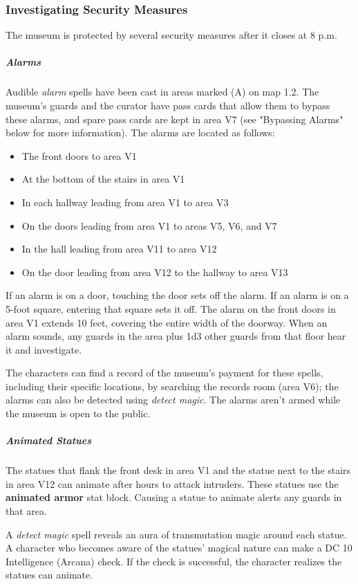 \documentclass[10pt,a4paper,twoside,bg=print,twocolumn,openany,nodeprecatedcode]{dndbook}
\begin{document}
\subsubsection{Investigating Security Measures}
The museum is protected by several security measures after it closes at 8 p.m.

\subparagraph{Alarms}
Audible \textit{alarm} spells have been cast in areas marked (A) on map 1.2. The museum's guards and the curator have pass cards that allow them to bypass these alarms, and spare pass cards are kept in area V7 (see "Bypassing Alarms" below for more information). The alarms are located as follows:


\begin{itemize}
\item The front doors to area V1
\item At the bottom of the stairs in area V1
\item In each hallway leading from area V1 to area V3
\item On the doors leading from area V1 to areas V5, V6, and V7
\item In the hall leading from area V11 to area V12
\item On the door leading from area V12 to the hallway to area V13
\end{itemize}

If an alarm is on a door, touching the door sets off the alarm. If an alarm is on a 5-foot square, entering that square sets it off. The alarm on the front doors in area V1 extends 10 feet, covering the entire width of the doorway. When an alarm sounds, any guards in the area plus 1d3 other guards from that floor hear it and investigate.

The characters can find a record of the museum's payment for these spells, including their specific locations, by searching the records room (area V6); the alarms can also be detected using \textit{detect magic}. The alarms aren't armed while the museum is open to the public.

\subparagraph{Animated Statues}
The statues that flank the front desk in area V1 and the statue next to the stairs in area V12 can animate after hours to attack intruders. These statues use the \textbf{animated armor} stat block. Causing a statue to animate alerts any guards in that area.

A \textit{detect magic} spell reveals an aura of transmutation magic around each statue. A character who becomes aware of the statues' magical nature can make a DC 10 Intelligence (Arcana) check. If the check is successful, the character realizes the statues can animate.
\end{document}
